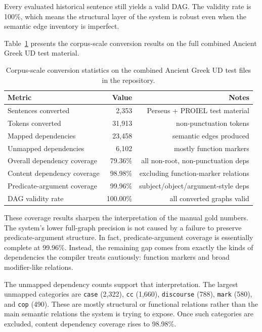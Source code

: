 \documentclass[11pt]{article}
\begin{document}
Every evaluated historical sentence still yields a valid DAG. The validity rate
is 100\%, which means the structural layer of the system is robust even when the
semantic edge inventory is imperfect.

Table~\ref{tab:coverage-results} presents the corpus-scale conversion results on
the full combined Ancient Greek UD test material.

\begin{table}[t]
\centering
\caption{Corpus-scale conversion statistics on the combined Ancient Greek UD
test files in the repository.}
\label{tab:coverage-results}
\begin{tabular}{lrr}
\toprule
Metric & Value & Notes \\
\midrule
Sentences converted & 2,353 & Perseus + PROIEL test material \\
Tokens converted & 31,913 & non-punctuation tokens \\
Mapped dependencies & 23,458 & semantic edges produced \\
Unmapped dependencies & 6,102 & mostly function markers \\
Overall dependency coverage & 79.36\% & all non-root, non-punctuation deps \\
Content dependency coverage & 98.98\% & excluding function-marker relations \\
Predicate-argument coverage & 99.96\% & subject/object/argument-style deps \\
DAG validity rate & 100.00\% & all converted graphs valid \\
\bottomrule
\end{tabular}
\end{table}

These coverage results sharpen the interpretation of the manual gold numbers.
The system's lower full-graph precision is not caused by a failure to preserve
predicate-argument structure. In fact, predicate-argument coverage is essentially
complete at 99.96\%. Instead, the remaining gap comes from exactly the kinds of
dependencies the compiler treats cautiously: function markers and broad
modifier-like relations.

The unmapped dependency counts support that interpretation. The largest unmapped
categories are \texttt{case} (2,322), \texttt{cc} (1,660), \texttt{discourse}
(788), \texttt{mark} (580), and \texttt{cop} (490). These are mostly structural
or functional relations rather than the main semantic relations the system is
trying to expose. Once such categories are excluded, content dependency coverage
rises to 98.98\%.
\end{document}
